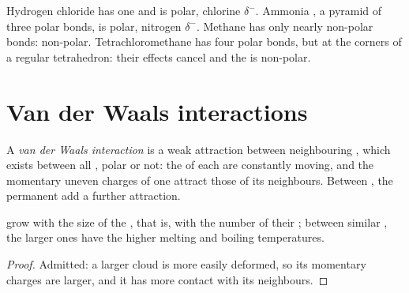 \begin{example}\label{ex:g11:polarity-and-cohesion:four}
Hydrogen chloride  has one  and is polar, chlorine
$\delta^-$. Ammonia , a pyramid of three polar  bonds,
is polar, nitrogen $\delta^-$. Methane  has only nearly non-polar
 bonds: non-polar. Tetrachloromethane  has four polar
 bonds, but at the corners of a regular tetrahedron: their
effects cancel and the  is non-polar.
\end{example}

\section{Van der Waals interactions}

\begin{definition}\label{def:g11:polarity-and-cohesion:van-der-waals}
A \emph{van der Waals interaction} is a
weak attraction between neighbouring , which exists between all
, polar or not: the  of each  are constantly
moving, and the momentary uneven charges of one  attract those
of its neighbours. Between , the permanent  add a further attraction.
\end{definition}


\begin{proposition}\label{prop:g11:polarity-and-cohesion:size}
 grow with the size of the , that is,
with the number of their ; between similar , the
larger ones have the higher melting and boiling temperatures.
\end{proposition}

\begin{proof}
Admitted: a larger  cloud is more easily deformed, so its
momentary charges are larger, and it has more contact with its
neighbours.
\end{proof}

